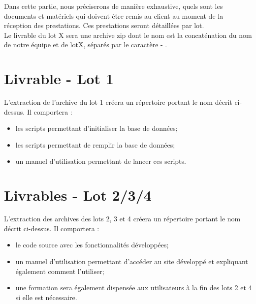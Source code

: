 Dans cette partie, nous préciserons de manière exhaustive, quels sont les documents et matériels qui doivent être remis au client au moment de la réception des prestations. Ces prestations seront détaillées par lot.\\

Le livrable du lot X sera une archive zip dont le nom est la concaténation du nom de notre équipe \PICCourt et de lotX, séparés par le caractère \og - \fg{}.
\section{Livrable - Lot 1}
 L'extraction de l'archive du lot 1 créera un répertoire portant le nom décrit ci-dessus. Il comportera :
\begin{itemize}
\item les scripts permettant d'initialiser la base de données;
\item les scripts permettant de remplir la base de données;
\item un manuel d'utilisation permettant de lancer ces scripts. 
\end{itemize}

\section{Livrables - Lot 2/3/4}
L'extraction des archives des lots 2, 3 et 4 créera un répertoire portant le nom décrit ci-dessus. Il comportera :
\begin{itemize}
\item le code source avec les fonctionnalités développées; 
\item un manuel d'utilisation permettant d'accéder au site développé et expliquant également comment l'utiliser;
\item une formation sera également dispensée aux utilisateurs à la fin des lots 2 et 4 si elle est nécessaire.
\end{itemize}
